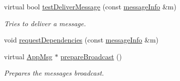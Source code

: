 \begin{DoxyCompactItemize}
virtual bool \hyperlink{class_node_with_recovery_aec147b3723b3dab00f9610453ba8daba}{test\+Deliver\+Message} (const \hyperlink{structures_8h_a7e7bdc1d2fff8a9436f2f352b2711ed6}{message\+Info} \&m)
\begin{DoxyCompactList}\small\item\em Tries to deliver a message. \end{DoxyCompactList}\item 
void \hyperlink{class_node_with_recovery_a8b16bbc948fddc744a55ac548348a988}{request\+Dependencies} (const \hyperlink{structures_8h_a7e7bdc1d2fff8a9436f2f352b2711ed6}{message\+Info} \&m)
\item 
virtual \hyperlink{class_app_msg}{App\+Msg} $\ast$ \hyperlink{class_node_with_recovery_a33d8e8775fd69cb647b38a54b36e1ebe}{prepare\+Broadcast} ()
\begin{DoxyCompactList}\small\item\em Prepares the message\textquotesingle{}s broadcast. \end{DoxyCompactList}\end{DoxyCompactItemize}
